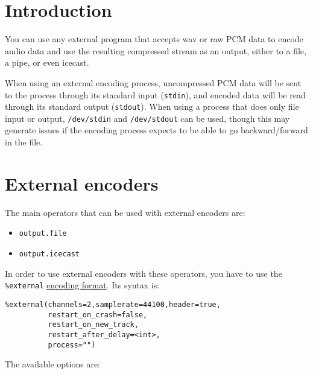 \section{Introduction}
You can use any external program that accepts wav or raw PCM data to encode audio data and use the resulting compressed 
stream as an output, either to a file, a pipe, or even icecast.

When using an external encoding process, uncompressed PCM data will be sent to the process through its standard input (\verb+stdin+), and encoded data will be read through its standard output (\verb+stdout+). When using a process that does only file input or output, \verb+/dev/stdin+ and \verb+/dev/stdout+ can be used, though this may generate issues if the encoding process expects to be able to go backward/forward in the file.

\section{External encoders}
The main operators that can be used with external encoders are:

\begin{itemize}
\item \verb+output.file+
\item \verb+output.icecast+

\end{itemize}
In order to use external encoders with these operators, you have to use the 
\verb+%external+ \href{encoding_formats.html}{encoding format}.
Its syntax is:

\begin{verbatim}
%external(channels=2,samplerate=44100,header=true,
          restart_on_crash=false,
          restart_on_new_track,
          restart_after_delay=<int>,
          process="")
\end{verbatim}
The available options are:

